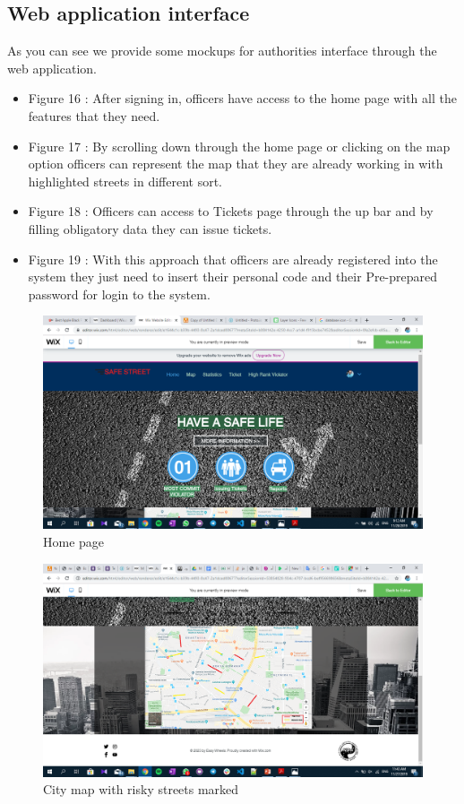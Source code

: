 \documentclass{article}
\begin{document}
	\subsection{Web application interface}
	As you can see we provide some mockups for authorities interface through the web application.
	\begin{itemize}
	\item Figure 16 : After signing in, officers have access to the home page with all the features that they need.
	\item Figure 17 : By scrolling down through the home page or clicking on the map option officers can represent the map that they are already working in with highlighted streets in different sort.
	\item Figure 18 : Officers can access to Tickets page through the up bar and by filling obligatory data they can issue tickets.
	\item Figure 19 : With this approach that officers are already registered into the system they just need to insert their personal code and their Pre-prepared password for login to the system.
	\end {itemize}
		\begin{figure}[h]
			\includegraphics[width=\linewidth]{images/home.png}
			\caption{Home page}
			\label{fig:web_homepage}
		\end{figure}
		\begin{figure}[h]
			\includegraphics[width=\linewidth]{images/map.png}
			\caption{City map with risky streets marked}
			\label{fig:web_map}
		\end{figure}
\end{document}
